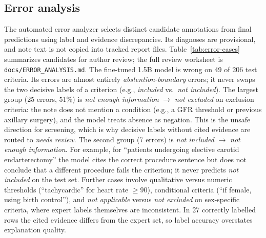 \subsection{Error analysis}
The automated error analyzer selects distinct candidate annotations from final predictions using label and evidence discrepancies. Its diagnoses are provisional, and note text is not copied into tracked report files. Table~\ref{tab:error-cases} summarizes candidates for author review; the full review worksheet is \texttt{docs/ERROR\_ANALYSIS.md}. The fine-tuned 1.5B model is wrong on 49 of 206 test criteria. Its errors are almost entirely \emph{abstention-boundary} errors; it never swaps the two decisive labels of a criterion (e.g., \emph{included} vs.\ \emph{not included}). The largest group (25 errors, 51\%) is \emph{not enough information} $\rightarrow$ \emph{not excluded} on exclusion criteria: the note does not mention a condition (e.g., a GFR threshold or previous axillary surgery), and the model treats absence as negation. This is the unsafe direction for screening, which is why decisive labels without cited evidence are routed to \emph{needs review}. The second group (7 errors) is \emph{not included} $\rightarrow$ \emph{not enough information}. For example, for ``patients undergoing elective carotid endarterectomy'' the model cites the correct procedure sentence but does not conclude that a different procedure fails the criterion; it never predicts \emph{not included} on the test set. Further cases involve qualitative versus numeric thresholds (``tachycardic'' for heart rate $\geq 90$), conditional criteria (``if female, using birth control''), and \emph{not applicable} versus \emph{not excluded} on sex-specific criteria, where expert labels themselves are inconsistent. In 27 correctly labelled rows the cited evidence differs from the expert set, so label accuracy overstates explanation quality.

